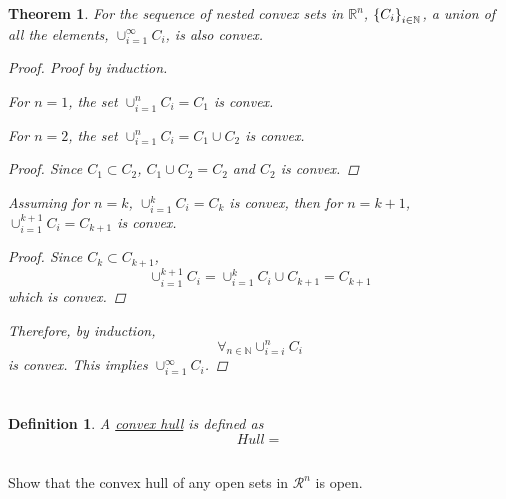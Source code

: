 \documentclass[]{article}
\newcommand{\R}{\mathbb{R}}
\newcommand{\N}{\mathbb{N}}
\newtheorem{definition}{Definition}
\newtheorem{theorem}{Theorem}
\begin{document}
\begin{theorem}
    For the sequence of nested convex sets in $\R^n$, $\qty{C_i}_{i \in \N}$, a union of all the elements, $\cup_{i = 1}^\infty C_i$, is also convex.
    \begin{proof}
        Proof by induction.
        
        For $n = 1$, the set $\cup_{i = 1}^n C_i = C_1$ is convex.
        
        For $n = 2$, the set $\cup_{i = 1}^n C_i = C_1 \cup C_2$ is convex.
        \begin{proof}
            Since $C_1 \subset C_2$, $C_1 \cup C_2 = C_2$ and $C_2$ is convex.
        \end{proof}

        Assuming for $n = k$, $\cup_{i = 1}^k C_i = C_k$ is convex, 
        then for $n = k+1$, $\cup_{i = 1}^{k + 1} C_i = C_{k + 1}$ is convex.
        \begin{proof}
            Since $C_k \subset C_{k+1}$, \[
                \cup_{i = 1}^{k + 1} C_i = \cup_{i = 1}^{k} C_i \cup C_{k + 1} = C_{k + 1}
            \]
            which is convex.
        \end{proof}

        Therefore, by induction, \[
            \forall_{n \in \N} \cup_{i = i}^n C_i
        \]
        is convex.
        This implies $\cup_{i = 1}^\infty C_i$.
    \end{proof}
\end{theorem}

\newpage
\section{}

\begin{definition}
    A \emph{\underline{convex hull}} is defined as
    \[
        Hull=
    \]
\end{definition}

\subsection{}
Show that the convex hull of any open sets in $\mathcal{R}^n$ is open.










\end{document}
